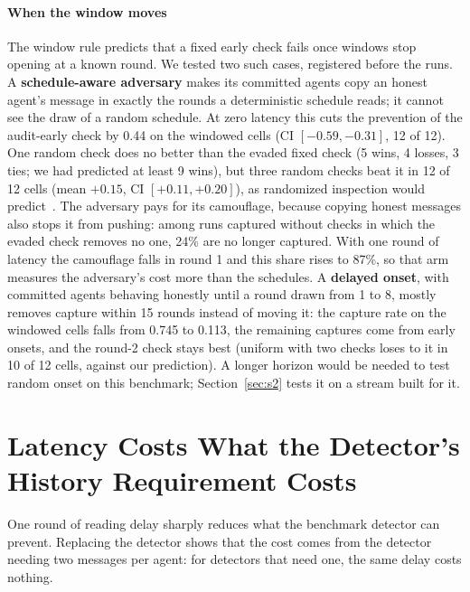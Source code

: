 \documentclass[pdflatex,sn-mathphys-num]{sn-jnl}
\theoremstyle{thmstyleone}%
\begin{document}
\paragraph{When the window moves}
The window rule predicts that a fixed early check fails once windows stop opening at a known round. We tested two such cases, registered before the runs. A \textbf{schedule-aware adversary} makes its committed agents copy an honest agent's message in exactly the rounds a deterministic schedule reads; it cannot see the draw of a random schedule. At zero latency this cuts the prevention of the audit-early check by 0.44 on the windowed cells (CI $[-0.59, -0.31]$, 12 of 12). One random check does no better than the evaded fixed check (5 wins, 4 losses, 3 ties; we had predicted at least 9 wins), but three random checks beat it in 12 of 12 cells (mean $+0.15$, CI $[+0.11, +0.20]$), as randomized inspection would predict~\cite{blocki2015auditgames}. The adversary pays for its camouflage, because copying honest messages also stops it from pushing: among runs captured without checks in which the evaded check removes no one, 24\% are no longer captured. With one round of latency the camouflage falls in round 1 and this share rises to 87\%, so that arm measures the adversary's cost more than the schedules. A \textbf{delayed onset}, with committed agents behaving honestly until a round drawn from 1 to 8, mostly removes capture within 15 rounds instead of moving it: the capture rate on the windowed cells falls from 0.745 to 0.113, the remaining captures come from early onsets, and the round-2 check stays best (uniform with two checks loses to it in 10 of 12 cells, against our prediction). A longer horizon would be needed to test random onset on this benchmark; Section~\ref{sec:s2} tests it on a stream built for it.

\section{Latency Costs What the Detector's History Requirement Costs}
\label{sec:latency}

One round of reading delay sharply reduces what the benchmark detector can prevent. Replacing the detector shows that the cost comes from the detector needing two messages per agent: for detectors that need one, the same delay costs nothing.
\end{document}
